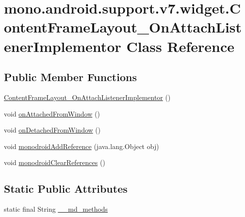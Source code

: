 \hypertarget{classmono_1_1android_1_1support_1_1v7_1_1widget_1_1_content_frame_layout___on_attach_listener_implementor}{
\section{mono.android.support.v7.widget.ContentFrameLayout\_\-OnAttachListenerImplementor Class Reference}
\label{classmono_1_1android_1_1support_1_1v7_1_1widget_1_1_content_frame_layout___on_attach_listener_implementor}
}
\subsection*{Public Member Functions}
\begin{CompactItemize}
\item 
\hyperlink{classmono_1_1android_1_1support_1_1v7_1_1widget_1_1_content_frame_layout___on_attach_listener_implementor_ec7cf0cc0519f825ddfd512063368e79}{ContentFrameLayout\_\-OnAttachListenerImplementor} ()
\item 
void \hyperlink{classmono_1_1android_1_1support_1_1v7_1_1widget_1_1_content_frame_layout___on_attach_listener_implementor_ebc22e6de85c5f2e510d674d2fdc2d7e}{onAttachedFromWindow} ()
\item 
void \hyperlink{classmono_1_1android_1_1support_1_1v7_1_1widget_1_1_content_frame_layout___on_attach_listener_implementor_e3cd180a0da45d1e2f553cc2d63a68af}{onDetachedFromWindow} ()
\item 
void \hyperlink{classmono_1_1android_1_1support_1_1v7_1_1widget_1_1_content_frame_layout___on_attach_listener_implementor_66402d6035c251dd704de8c08cb0c3e3}{monodroidAddReference} (java.lang.Object obj)
\item 
void \hyperlink{classmono_1_1android_1_1support_1_1v7_1_1widget_1_1_content_frame_layout___on_attach_listener_implementor_5aeae467b8295109705d686c3e7664c7}{monodroidClearReferences} ()
\end{CompactItemize}
\subsection*{Static Public Attributes}
\begin{CompactItemize}
\item 
static final String \hyperlink{classmono_1_1android_1_1support_1_1v7_1_1widget_1_1_content_frame_layout___on_attach_listener_implementor_db104bec4ab09495309f1f1f22b6fac4}{\_\-\_\-md\_\-methods}
\end{CompactItemize}
